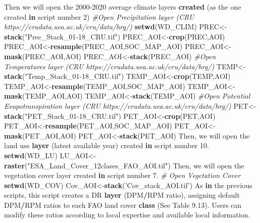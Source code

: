 \documentclass[
  10pt,
  b5paper,
]{book}
\newenvironment{Shaded}{\begin{snugshade}}{\end{snugshade}}
\newcommand{\CommentTok}[1]{\textcolor[rgb]{0.56,0.35,0.01}{\textit{#1}}}
\newcommand{\ControlFlowTok}[1]{\textcolor[rgb]{0.13,0.29,0.53}{\textbf{#1}}}
\newcommand{\DecValTok}[1]{\textcolor[rgb]{0.00,0.00,0.81}{#1}}
\newcommand{\FloatTok}[1]{\textcolor[rgb]{0.00,0.00,0.81}{#1}}
\newcommand{\KeywordTok}[1]{\textcolor[rgb]{0.13,0.29,0.53}{\textbf{#1}}}
\newcommand{\NormalTok}[1]{#1}
\newcommand{\OperatorTok}[1]{\textcolor[rgb]{0.81,0.36,0.00}{\textbf{#1}}}
\newcommand{\StringTok}[1]{\textcolor[rgb]{0.31,0.60,0.02}{#1}}
\begin{document}
\begin{Shaded}
\begin{Highlighting}[]
\NormalTok{Then we will open the }\DecValTok{2000-2020}\NormalTok{ average climate layers }\KeywordTok{created}\NormalTok{ (as the one created }\ControlFlowTok{in}\NormalTok{ script number }\DecValTok{2}\NormalTok{)}
\CommentTok{#Open Precipitation layer (CRU https://crudata.uea.ac.uk/cru/data/hrg/)}
\KeywordTok{setwd}\NormalTok{(WD_CLIM)}
\NormalTok{PREC<-}\KeywordTok{stack}\NormalTok{(}\StringTok{"Prec_Stack_01-18_CRU.tif"}\NormalTok{)}
\NormalTok{PREC_AOI<-}\KeywordTok{crop}\NormalTok{(PREC,AOI)}
\NormalTok{PREC_AOI<-}\KeywordTok{resample}\NormalTok{(PREC_AOI,SOC_MAP_AOI)}
\NormalTok{PREC_AOI<-}\KeywordTok{mask}\NormalTok{(PREC_AOI,AOI)}
\NormalTok{PREC_AOI<-}\KeywordTok{stack}\NormalTok{(PREC_AOI)}
\CommentTok{#Open Temperatures layer (CRU https://crudata.uea.ac.uk/cru/data/hrg/)}
\NormalTok{TEMP<-}\KeywordTok{stack}\NormalTok{(}\StringTok{"Temp_Stack_01-18_CRU.tif"}\NormalTok{)}
\NormalTok{TEMP_AOI<-}\KeywordTok{crop}\NormalTok{(TEMP,AOI)}
\NormalTok{TEMP_AOI<-}\KeywordTok{resample}\NormalTok{(TEMP_AOI,SOC_MAP_AOI)}
\NormalTok{TEMP_AOI<-}\KeywordTok{mask}\NormalTok{(TEMP_AOI,AOI)}
\NormalTok{TEMP_AOI<-}\KeywordTok{stack}\NormalTok{(TEMP_AOI)}
\CommentTok{#Open Potential Evapotranspiration layer (CRU https://crudata.uea.ac.uk/cru/data/hrg/)}
\NormalTok{PET<-}\KeywordTok{stack}\NormalTok{(}\StringTok{"PET_Stack_01-18_CRU.tif"}\NormalTok{)}
\NormalTok{PET_AOI<-}\KeywordTok{crop}\NormalTok{(PET,AOI)}
\NormalTok{PET_AOI<-}\KeywordTok{resample}\NormalTok{(PET_AOI,SOC_MAP_AOI)}
\NormalTok{PET_AOI<-}\KeywordTok{mask}\NormalTok{(PET_AOI,AOI)}
\NormalTok{PET_AOI<-}\KeywordTok{stack}\NormalTok{(PET_AOI)}
\NormalTok{Then, we will open the land use }\KeywordTok{layer}\NormalTok{ (latest available year) created }\ControlFlowTok{in}\NormalTok{ script number }\FloatTok{10.}
\KeywordTok{setwd}\NormalTok{(WD_LU)}
\NormalTok{LU_AOI<-}\KeywordTok{raster}\NormalTok{(}\StringTok{"ESA_Land_Cover_12clases_FAO_AOI.tif"}\NormalTok{)}
\NormalTok{Then, we will open the vegetation cover layer created }\ControlFlowTok{in}\NormalTok{ script number }\FloatTok{7.}
\CommentTok{# Open Vegetation Cover }
\KeywordTok{setwd}\NormalTok{(WD_COV)}
\NormalTok{Cov_AOI<-}\KeywordTok{stack}\NormalTok{(}\StringTok{'Cov_stack_AOI.tif'}\NormalTok{)}
\NormalTok{As }\ControlFlowTok{in}\NormalTok{ the previous scripts, this script creates a DR }\KeywordTok{layer}\NormalTok{ (DPM}\OperatorTok{/}\NormalTok{RPM ratio), assigning default DPM}\OperatorTok{/}\NormalTok{RPM ratios to each FAO land cover }\KeywordTok{class}\NormalTok{ (See Table }\FloatTok{9.13}\NormalTok{). Users can modify these ratios according to local expertise and available local information. }

\end{Highlighting}
\end{Shaded}
\end{document}
